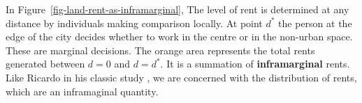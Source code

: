 In Figure~\ref{fig-land-rent-as-inframarginal}, The level of rent is determined at any distance by individuals making comparison locally. At point $d^*$ the person at the edge of the city decides whether to work in the centre or in the non-urban space. These are \gls{marginal} decisions. The orange area represents  the total rents generated between $d=0$ and $d=d^*$. It is a summation of \textbf{\gls{inframarginal}} rents. Like Ricardo in his classic study \cite{ricardoEssayInfluenceLow1815}, we are concerned with the distribution of rents, which are an  inframaginal quantity.


 









